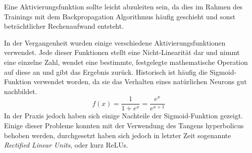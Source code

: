 Eine Aktivierungsfunktion sollte leicht abzuleiten sein, 
da dies im Rahmen des Trainings mit dem Backpropagation Algorithmus häufig geschieht und sonst beträchtlicher Rechenaufwand entsteht.

In der Vergangenheit wurden einige verschiedene Aktivierungsfunktionen verwendet.
Jede dieser Funktionen stellt eine Nicht-Linearität dar und nimmt eine einzelne Zahl, wendet eine bestimmte, festgelegte mathematische 
Operation auf diese an und gibt das Ergebnis zurück.
Historisch ist häufig die Sigmoid-Funktion verwendet worden, da sie das Verhalten eines natürlichen Neurons gut nachbildet.
\begin{equation}
	f(x) = \frac{1}{1 + e^x} = \frac{e^x}{e^{x + 1}}
	\label{func:Sigmoid}
\end{equation}
In der Praxis jedoch haben sich einige Nachteile der Sigmoid-Funktion gezeigt.
Einige dieser Probleme konnten mit der Verwendung des Tangens hyperbolicus  behoben werden, 
durchgesetzt haben sich jedoch in letzter Zeit sogenannte \textit{Rectified Linear Units}, oder kurz ReLUs.

	
	
